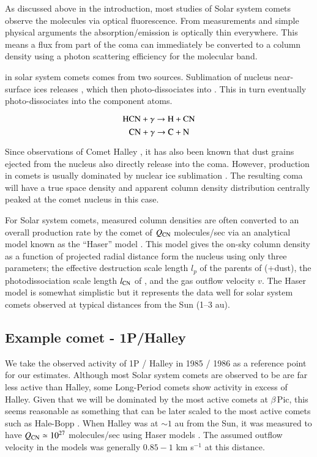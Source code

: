 \documentclass{aa}
\newcommand{\kms}{km s$^{-1}$}
\newcommand{\bp}{$\beta$\,Pic}
\begin{document}
As discussed above in the introduction, most studies of Solar system comets observe the  molecules via optical fluorescence. 
%
From measurements and simple physical arguments the  absorption/emission is optically thin everywhere.
%
This means a flux from part of the coma can immediately be converted to a column density using a photon scattering efficiency for the molecular band.

 in solar system comets comes from two sources.
%
Sublimation of nucleus near-surface ices releases , which then photo-dissociates into .
%
This in turn eventually photo-dissociates into the component atoms.

$$\ce{HCN} +\gamma \rightarrow \ce{H}+\ce{CN}$$
$$\ce{CN} + \gamma \rightarrow \ce{C}+\ce{N}$$

Since observations of Comet Halley \citep{AHearn1986}, it has also been known that dust grains ejected from the nucleus also directly release  into the coma.
%
However,  production in comets is usually dominated by nuclear ice sublimation \citep{Fray2005}.
%
The resulting  coma will have a true space density and apparent column density distribution centrally peaked at the comet nucleus in this case.

For Solar system comets, measured  column densities are often converted to an overall production rate by the comet of $Q_{\ce{CN}}$ molecules/sec via an analytical model known as the ``Haser'' model \citep{Haser2020}.
%
This model gives the on-sky column density as a function of projected radial distance form the nucleus using only three parameters; the effective destruction scale length $l_p$ of the parents of  (+dust), the photodissociation scale length $l_{\ce{CN}}$ of , and the gas outflow velocity $v$.
%
The Haser model is somewhat simplistic but it represents the data well for solar system comets observed at typical distances from the Sun (1--3 au).

\subsection{Example comet - 1P/Halley}

We take the observed activity of 1P / Halley in 1985 / 1986 as a reference point for our estimates.
%
Although most Solar system comets are observed to be are far less active than Halley, some Long-Period comets show activity in excess of Halley.
%
Given that we will be dominated by the most active comets at \bp{}, this seems reasonable as something that can be later scaled to the most active comets such as Hale-Bopp \citep{Schleicher2024}.
%
When Halley was at $\sim 1$ au from the Sun, it was measured to have $Q_{\ce{CN}}\simeq 10^{27}$ molecules/sec using Haser models \citep{AHearn1995}.
%
The assumed outflow velocity in the models was generally  $0.85 - 1$ \kms{} at this distance.
\end{document}
